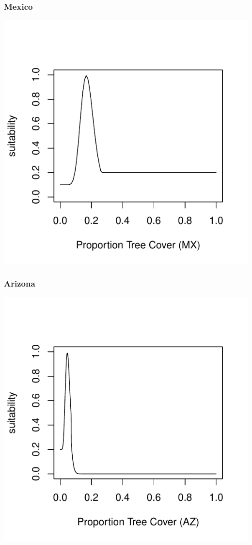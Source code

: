 \documentclass[12pt,letterpaper]{article}\usepackage{graphicx, color}
\makeatletter
\def\maxwidth{ %
  \ifdim\Gin@nat@width>\linewidth
    \linewidth
  \else
    \Gin@nat@width
  \fi
}
\newenvironment{knitrout}{}{} %
\makeatother
\begin{document}
\subsubsection{Mexico}
\begin{knitrout}
\color{fgcolor}\includegraphics[width=\maxwidth]{figure/Goodwin_Tree_Cover_MX} 
\end{knitrout}

\subsubsection{Arizona}
\begin{knitrout}
\color{fgcolor}\includegraphics[width=\maxwidth]{figure/Goodwin_Tree_Cover_AZ} 
\end{knitrout}
\end{document}
